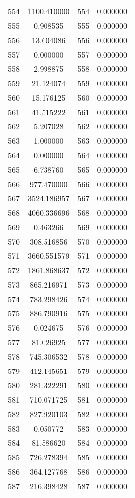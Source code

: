 \documentclass[12pt]{article}
\begin{document}
\begin{longtable}{@{}cccc@{}}
554 & 1100.410000 & 554 & 0.000000 \\
555 & 0.908535 & 555 & 0.000000 \\
556 & 13.604086 & 556 & 0.000000 \\
557 & 0.000000 & 557 & 0.000000 \\
558 & 2.998875 & 558 & 0.000000 \\
559 & 21.124074 & 559 & 0.000000 \\
560 & 15.176125 & 560 & 0.000000 \\
561 & 41.515222 & 561 & 0.000000 \\
562 & 5.207028 & 562 & 0.000000 \\
563 & 1.000000 & 563 & 0.000000 \\
564 & 0.000000 & 564 & 0.000000 \\
565 & 6.738760 & 565 & 0.000000 \\
566 & 977.470000 & 566 & 0.000000 \\
567 & 3524.186957 & 567 & 0.000000 \\
568 & 4060.336696 & 568 & 0.000000 \\
569 & 0.463266 & 569 & 0.000000 \\
570 & 308.516856 & 570 & 0.000000 \\
571 & 3660.551579 & 571 & 0.000000 \\
572 & 1861.868637 & 572 & 0.000000 \\
573 & 865.216971 & 573 & 0.000000 \\
574 & 783.298426 & 574 & 0.000000 \\
575 & 886.790916 & 575 & 0.000000 \\
576 & 0.024675 & 576 & 0.000000 \\
577 & 81.026925 & 577 & 0.000000 \\
578 & 745.306532 & 578 & 0.000000 \\
579 & 412.145651 & 579 & 0.000000 \\
580 & 281.322291 & 580 & 0.000000 \\
581 & 710.071725 & 581 & 0.000000 \\
582 & 827.920103 & 582 & 0.000000 \\
583 & 0.050772 & 583 & 0.000000 \\
584 & 81.586620 & 584 & 0.000000 \\
585 & 726.278394 & 585 & 0.000000 \\
586 & 364.127768 & 586 & 0.000000 \\
587 & 216.398428 & 587 & 0.000000 \\

\end{longtable}
\end{document}
